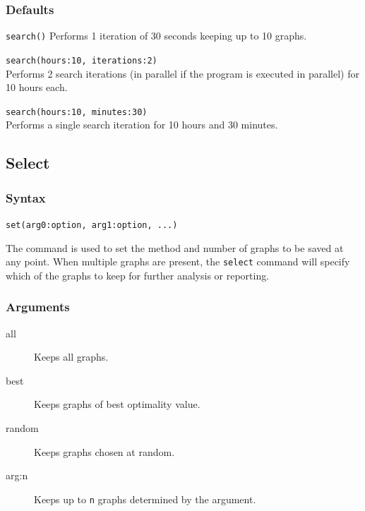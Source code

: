 	\subsubsection{Defaults}
		\texttt{search()} Performs 1 iteration of 30 seconds keeping up to 10 graphs.
		
	\begin{example}
		\item{\texttt{search(hours:10, iterations:2)}\\ Performs 2 search iterations (in parallel if the 
		program is executed in parallel) for 10 hours each.}
				
		\item{\texttt{search(hours:10, minutes:30)}\\ Performs a single search iteration for 10 
		hours and 30 minutes.}
	\end{example}
	
\subsection{Select}
	\subsubsection{Syntax}
		\texttt{set(arg0:option, arg1:option, ...)}
	
	\begin{phygdescription}
		{The command is used to set the method and number of graphs to be saved at any point.
		When multiple graphs are present, the \texttt{select} command will specify which of the 
		graphs to keep for further analysis or reporting.}
	\end{phygdescription}
				
	\subsubsection{Arguments}
		\begin{description}
			\item[all] Keeps all graphs.
		
			\item[best] Keeps graphs of best optimality value.
			
			\item[random] Keeps graphs chosen at random.
			
			\item[arg:n] Keeps up to \texttt{n} graphs determined by the argument.
		\end{description}

